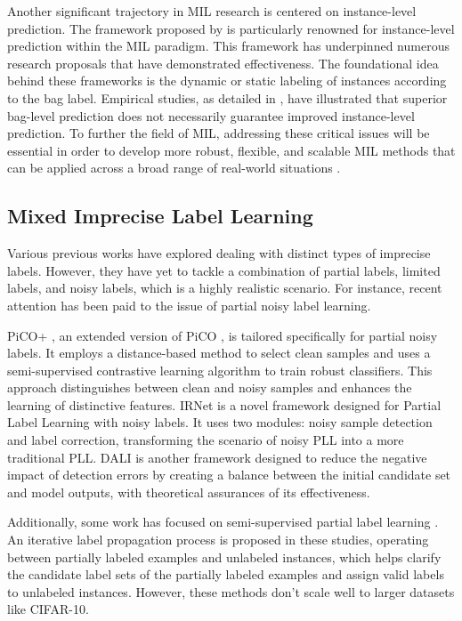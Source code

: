 Another significant trajectory in MIL research is centered on instance-level prediction. The framework proposed by \citet{maron1997framework} is particularly renowned for instance-level prediction within the MIL paradigm. This framework has underpinned numerous research proposals that have demonstrated effectiveness. The foundational idea behind these frameworks is the dynamic or static labeling of instances according to the bag label.
Empirical studies, as detailed in \citep{vanwinckelen2016instance}, have illustrated that superior bag-level prediction does not necessarily guarantee improved instance-level prediction.
To further the field of MIL, addressing these critical issues will be essential in order to develop more robust, flexible, and scalable MIL methods that can be applied across a broad range of real-world situations \citep{zhang2021training}.






\subsection{Mixed Imprecise Label Learning}

Various previous works have explored dealing with distinct types of imprecise labels. However, they have yet to tackle a combination of partial labels, limited labels, and noisy labels, which is a highly realistic scenario. For instance, recent attention has been paid to the issue of partial noisy label learning.



PiCO+ \citep{wang2022pico+}, an extended version of PiCO \citep{wang2022pico}, is tailored specifically for partial noisy labels. It employs a distance-based method to select clean samples and uses a semi-supervised contrastive learning algorithm to train robust classifiers. This approach distinguishes between clean and noisy samples and enhances the learning of distinctive features.
IRNet \citep{lian2022irnet} is a novel framework designed for Partial Label Learning with noisy labels. It uses two modules: noisy sample detection and label correction, transforming the scenario of noisy PLL into a more traditional PLL.
DALI \citep{xu2023dali} is another framework designed to reduce the negative impact of detection errors by creating a balance between the initial candidate set and model outputs, with theoretical assurances of its effectiveness.

Additionally, some work has focused on semi-supervised partial label learning \citep{wang2019partial,wang2020semi}. An iterative label propagation process is proposed in these studies, operating between partially labeled examples and unlabeled instances, which helps clarify the candidate label sets of the partially labeled examples and assign valid labels to unlabeled instances. However, these methods don't scale well to larger datasets like CIFAR-10.


